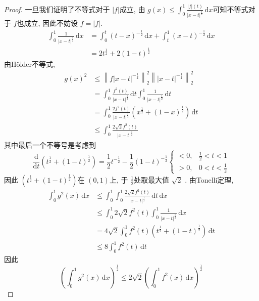\documentclass[../main.tex]{subfiles}
\begin{document}
\begin{proof}
     一旦我们证明了不等式对于 \(  \left| f \right|   \)成立, 由 \(  g\left( x \right)\le \int_{0}^{1}\frac{\left| f \right|\left( t \right)   }{ \left| x-t \right|^{\frac{1}{2}} }\,\mathrm{d} x    \)可知不等式对于 \(  f  \)也成立, 因此不妨设 \(  f= \left| f \right|   \).       
    \[
   \begin{aligned}
    \int_{0}^{1}\frac{1 }{\left| x-t \right|^{\frac{1}{2}}  }\,\mathrm{d} x&= \int_{0}^{t}\left( t-x \right)^{-\frac{1}{2}}\,\mathrm{d} x+ \int_{t}^{1}\left( x-t \right)^{-\frac{1}{2}}\,\mathrm{d} x\\ 
     &=2t^{\frac{1}{2}}+  2\left( 1-t \right)^{\frac{1}{2}}
   \end{aligned}   
    \]  由H\"older不等式,  \[
   \begin{aligned}
    g\left( x \right)^{2}&\le \left\| f\left| x-t \right|^{-\frac{1}{4}}  \right\|_{2}^{2}\left\| \left| x-t \right|^{-\frac{1}{4}}  \right\|_{2}^{2}  \\ 
     &= \int_{0}^{1} \frac{f^{2}\left( t \right)  }{\left| x-t \right|^{\frac{1}{2}}  }\,\mathrm{d} t \int_{0}^{1}\frac{1 }{\left| x-t \right|^{\frac{1}{2}}  }\,\mathrm{d} t  \\ 
      &= \int_{0}^{1}\frac{2f^{2}\left( t \right)  }{\left| x-t \right|^{\frac{1}{2}}  }\left( x^{\frac{1}{2}}+ \left( 1-x \right)^{\frac{1}{2}}  \right)\,\mathrm{d} t  \\ 
       &\le \int_{0}^{1}\frac{2\sqrt{2}f^{2}\left( t \right)  }{\left| x-t \right|^{\frac{1}{2}}  } 
   \end{aligned}
    \]其中最后一个不等号是考虑到\[
  \frac{\mathrm{d}}{\mathrm{d}t}\left( t^{\frac{1}{2}}+ \left( 1-t \right)  ^{\frac{1}{2}}\right)  = \frac{1}{2}t^{-\frac{1}{2}}-\frac{1}{2}\left( 1-t \right)^{-\frac{1}{2}} \begin{cases} <  0,&\frac{1}{2}< t< 1\\ 
   >  0,& 0< t< \frac{1}{2}  \end{cases} 
    \]因此 \(  \left( t^{\frac{1}{2}}+ \left( 1-t \right)^{\frac{1}{2}}  \right)   \)在 \(  \left( 0,1 \right)   \)上, 于 \(  \frac{1}{2}  \)处取最大值 \(  \sqrt{2}  \)    . 由Tonelli定理,  \[
    \begin{aligned}
    \int_{0}^{1}g^{2}\left( x \right)\,\mathrm{d} x&\le  \int_{0}^{1}\int_{0}^{1}\frac{2\sqrt{2}f^{2}\left( t \right)  }{\left| x-t \right|^{\frac{1}{2}}  }\,\mathrm{d} t\,\mathrm{d} x\\ 
     &\le    \int_{0}^{1}2\sqrt{2}f^{2}\left( t \right) \int_{0}^{1}\frac{1 }{\left| x-t \right|^{\frac{1}{2}}  }\,\mathrm{d} x\\ 
      &=4\sqrt{2} \int_{0}^{1}f^{2}\left( t \right)\left( t^{\frac{1}{2}}+ \left( 1-t \right)^{\frac{1}{2}}  \right)\,\mathrm{d} t     \\ 
       &\le 8\int_{0}^{1}f^{2}\left( t \right)\,\mathrm{d} t 
    \end{aligned} 
    \]因此 \[
    \left( \int_{0}^{1}g^{2}\left( x \right)\,\mathrm{d} x  \right)^{\frac{1}{2}} \le 2\sqrt{2} \left( \int_{0}^{1}f^{2}\left( x \right)\,\mathrm{d} x  \right)^{\frac{1}{2}} 
    \]
\end{proof}
\end{document}
